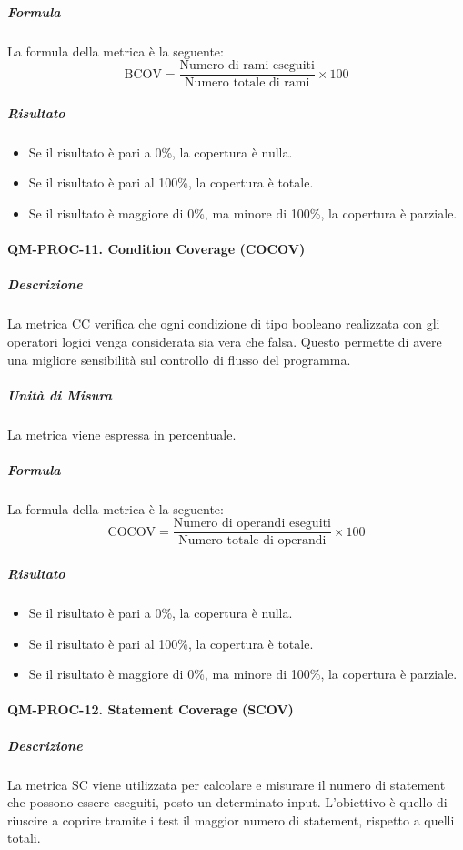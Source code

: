 			\subparagraph{Formula}
			La formula della metrica è la seguente:
			\[
				\text{BCOV} = \frac{\text{Numero di rami eseguiti}}{\text{Numero totale di rami}} \times 100
			\]

			\subparagraph{Risultato}
			\begin{itemize}
				\item Se il risultato è pari a 0\%, la copertura è nulla.
				\item Se il risultato è pari al 100\%, la copertura è totale.
				\item Se il risultato è maggiore di 0\%, ma minore di 100\%, la copertura è parziale.
			\end{itemize}

		\paragraph{QM-PROC-11. Condition Coverage (COCOV)}

			\subparagraph{Descrizione}
			La metrica CC verifica che ogni condizione di tipo booleano realizzata con gli operatori logici venga considerata sia vera che falsa. Questo permette di avere una migliore sensibilità sul controllo di flusso del programma.

			\subparagraph{Unità di Misura}
			La metrica viene espressa in percentuale.

			\subparagraph{Formula}
			La formula della metrica è la seguente:
			\[
				\text{COCOV} = \frac{\text{Numero di operandi eseguiti}}{\text{Numero totale di operandi}} \times 100
			\]

			\subparagraph{Risultato}
			\begin{itemize}
				\item Se il risultato è pari a 0\%, la copertura è nulla.
				\item Se il risultato è pari al 100\%, la copertura è totale.
				\item Se il risultato è maggiore di 0\%, ma minore di 100\%, la copertura è parziale.
			\end{itemize}

		\paragraph{QM-PROC-12. Statement Coverage (SCOV)}

			\subparagraph{Descrizione}
			La metrica SC viene utilizzata per calcolare e misurare il numero di statement che possono essere eseguiti, posto un determinato input. L'obiettivo è quello di riuscire a coprire tramite i test il maggior numero di statement, rispetto a quelli totali.

